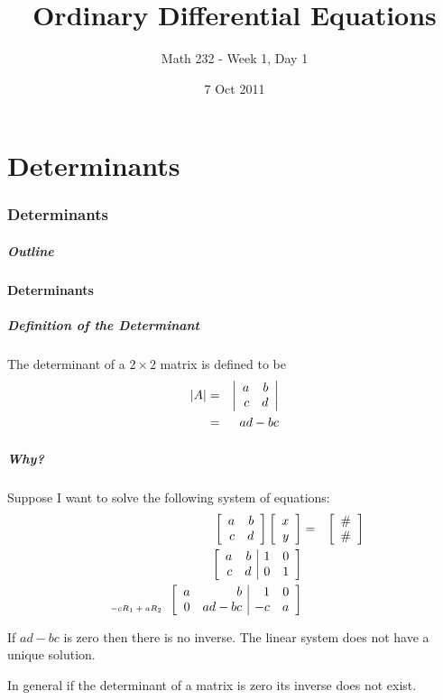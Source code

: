\part{Determinants}
\section{Determinants}

\title{Ordinary Differential Equations}
\subtitle{Math 232 - Week 1, Day 1}
\date{7 Oct 2011}

\begin{frame}
  \titlepage
\end{frame}

\begin{frame}
  \frametitle{Outline}
\end{frame}


\subsection{Determinants}


\begin{frame}
  \frametitle{Definition of the Determinant}

  The determinant of a $2\times 2$ matrix is defined to be
  \begin{eqnarray*}
    |A| & = & \left| \begin{array}{rr} a & b \\ c & d \end{array} \right| \\
    & = & ad - bc
  \end{eqnarray*}

\end{frame}


\begin{frame}
  \frametitle{Why?}

  Suppose I want to solve the following system of equations:
  \begin{eqnarray*}
    \arrayTwo{a}{b}{c}{d} \vecTwo{x}{y} & = & \vecTwo{\#}{\#} \\
    \startRowOpsTwo
    \oneRowOpsTwo{a}{b}{1}{0}
    \oneRowOpsTwo{c}{d}{0}{1}
    \stopRowOps \\
    \stateTwo{}{-cR_1+aR_2}
    \startRowOpsTwo
    \oneRowOpsTwo{a}{b}{1}{0}
    \oneRowOpsTwo{0}{ad-bc}{-c}{a}
    \stopRowOps
  \end{eqnarray*}

  {
    If $ad-bc$ is zero then there is no inverse. The linear system
    does not have a unique solution.
  }

  {
    In general if the determinant of a matrix is zero its inverse does
    not exist. 
  }

\end{frame}


